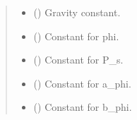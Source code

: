 \documentclass[a4paper,11pt,english,openany]{sphinxmanual}
\begin{document}
\begin{fulllineitems}
\begin{quote}
\begin{description}
\begin{itemize}
\item {} 
\sphinxAtStartPar
{} () \textendash{} Gravity constant.

\item {} 
\sphinxAtStartPar
{} () \textendash{} Constant for phi.

\item {} 
\sphinxAtStartPar
{} () \textendash{} Constant for P\_s.

\item {} 
\sphinxAtStartPar
{} () \textendash{} Constant for a\_phi.

\item {} 
\sphinxAtStartPar
{} () \textendash{} Constant for b\_phi.

\end{itemize}

\end{description}\end{quote}


\end{fulllineitems}
\end{document}
